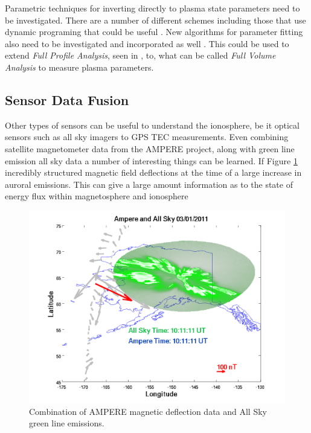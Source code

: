 Parametric techniques for inverting directly to plasma state parameters need to be investigated. There are a number of different schemes including those that use dynamic programing that could be useful \cite{Yau:1992kd,Yau:1993kf,Oktem:2014ju}. New algorithms for parameter fitting also need to be investigated and incorporated as well \cite{Shpynev:2010co}. This could be used to extend \textit{Full Profile Analysis}, seen in \cite{RDS:RDS3308,hysell2008}, to, what can be called \textit{Full Volume Analysis} to measure plasma parameters.

\subsection{Sensor Data Fusion}

Other types of sensors can be useful to understand the ionosphere, be it optical sensors such as all sky imagers to GPS TEC measurements. Even combining satellite magnetometer data from the AMPERE project\cite{Anderson:2000uh,Anderson:2014hf}, along with green line emission all sky data a number of interesting things can be learned. If Figure \ref{fig:swflow} incredibly structured magnetic field deflections at the time of a large increase in auroral emissions. This can give a large amount  information as to the state of energy flux within magnetosphere and ionosphere

\begin{figure}[h!]
\centering
\includegraphics[width=6.0in]{ampandallsky214}
\caption{Combination of AMPERE magnetic deflection data and All Sky green line emissions. }
\label{fig:swflow}
\end{figure}

